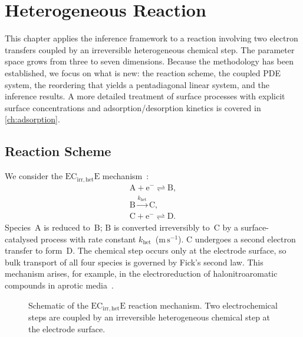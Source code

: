 \chapter{Heterogeneous Reaction}\label{ch:heterogeneous}

This chapter applies the inference framework to a reaction involving two
electron transfers coupled by an irreversible heterogeneous chemical
step. The parameter space grows from three to seven dimensions.
Because the methodology has been established, we focus on
what is new: the reaction scheme, the coupled PDE system, the reordering
that yields a pentadiagonal linear system, and the inference results. A
more detailed treatment of surface processes with explicit
surface concentrations and adsorption/desorption kinetics is covered
in \cref{ch:adsorption}.

\section{Reaction Scheme}\label{sec:het-scheme}

We consider the $\mathrm{EC}_{\mathrm{irr,het}}\mathrm{E}$
mechanism~\cite{compton2014understanding}:
\begin{equation}\label{eq:het-scheme}
  \begin{gathered}
    \mathrm{A} + \mathrm{e}^{-} \rightleftharpoons \mathrm{B}, \\
    \mathrm{B} \xrightarrow{k_{\mathrm{het}}} \mathrm{C}, \\
    \mathrm{C} + \mathrm{e}^{-} \rightleftharpoons \mathrm{D}.
  \end{gathered}
\end{equation}
Species~$\mathrm{A}$ is reduced to~$\mathrm{B}$; $\mathrm{B}$ is
converted irreversibly to~$\mathrm{C}$ by a surface-catalysed process
with rate constant $k_{\mathrm{het}}$~($\mathrm{m\,s^{-1}}$).
$\mathrm{C}$ undergoes a second electron transfer to form~$\mathrm{D}$.
The chemical step occurs only at the electrode surface, so bulk transport
of all four species is governed by Fick's second law. This mechanism
arises, for example, in the electroreduction of halonitroaromatic
compounds in aprotic media~\cite{compton2014understanding}.

\begin{figure}
  \centering
  
  \caption[Schematic of the
  $\mathrm{EC}_{\mathrm{irr,het}}\mathrm{E}$ reaction]{Schematic of
    the $\mathrm{EC}_{\mathrm{irr,het}}\mathrm{E}$ reaction mechanism.
    Two electrochemical steps are coupled by an irreversible
  heterogeneous chemical step at the electrode surface.}
  \label{fig:het-schematic}
\end{figure}


